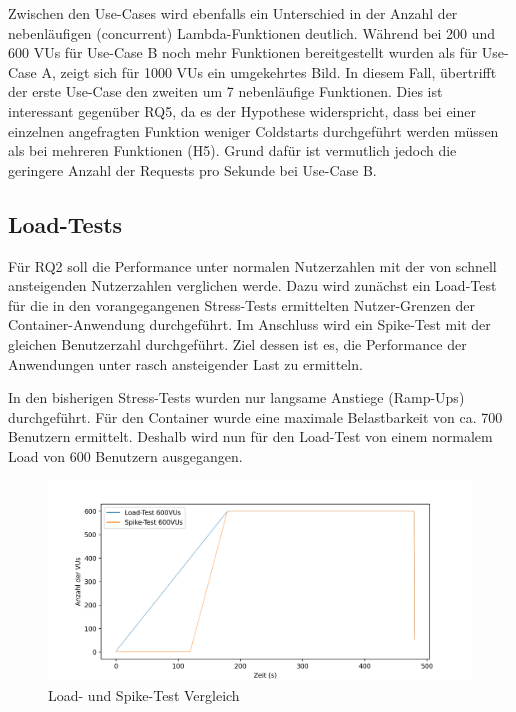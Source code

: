 Zwischen den Use-Cases wird ebenfalls ein Unterschied in der Anzahl der nebenläufigen (concurrent) Lambda-Funktionen deutlich. Während bei 200 und 600 VUs für Use-Case B noch mehr Funktionen bereitgestellt wurden als für Use-Case A, zeigt sich für 1000 VUs ein umgekehrtes Bild. In diesem Fall, übertrifft der erste Use-Case den zweiten um 7 nebenläufige Funktionen. Dies ist interessant gegenüber RQ5, da es der Hypothese widerspricht, dass bei einer einzelnen angefragten Funktion weniger Coldstarts durchgeführt werden müssen als bei mehreren Funktionen (H5). Grund dafür ist vermutlich jedoch die geringere Anzahl der Requests pro Sekunde bei Use-Case B. 

\subsection{Load-Tests}
Für RQ2 soll die Performance unter normalen Nutzerzahlen mit der von schnell ansteigenden Nutzerzahlen verglichen werde. Dazu wird zunächst ein Load-Test für die in den vorangegangenen Stress-Tests ermittelten Nutzer-Grenzen der Container-Anwendung durchgeführt. Im Anschluss wird ein Spike-Test mit der gleichen Benutzerzahl durchgeführt. Ziel dessen ist es, die Performance der Anwendungen unter rasch ansteigender Last zu ermitteln. 

In den bisherigen Stress-Tests wurden nur langsame Anstiege (Ramp-Ups) durchgeführt. Für den Container wurde eine maximale Belastbarkeit von ca. 700 Benutzern ermittelt. Deshalb wird nun für den Load-Test von einem normalem Load von 600 Benutzern ausgegangen. 

\begin{figure}[H]
    \includegraphics[width=\textwidth]{img/load600-vs-spike600.png}
    \caption[Load- und Spike-Test Vergleich]{Load- und Spike-Test Vergleich}
    \label{fig:load600-vs-spike600}
\end{figure}


